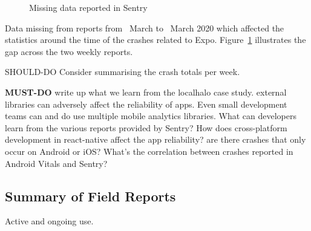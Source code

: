 \begin{figure}[htbp!]
\begin{minipage}{.5\textwidth}
  \label{fig:localhalo-sentry-weekly-report-23-mar-2020}
\end{minipage}
    \caption{Missing data reported in Sentry}
    \label{fig:sentry-missing-data-march-2020}
\end{figure}

Data missing from reports from~ March to~ March 2020 which affected the statistics around the time of the crashes related to Expo. Figure~\ref{fig:sentry-missing-data-march-2020} illustrates the gap across the two weekly reports. 

SHOULD-DO Consider summarising the crash totals per week. 

\textbf{MUST-DO} write up what we learn from the localhalo case study. external libraries can adversely affect the reliability of apps. Even small development teams can and do use multiple mobile analytics libraries. What can developers learn from the various reports provided by Sentry? How does cross-platform development in react-native affect the app reliability? are there crashes that only occur on Android or iOS? What's the correlation between crashes reported in Android Vitals and Sentry?


\subsection{Summary of Field Reports}
Active and ongoing use. 